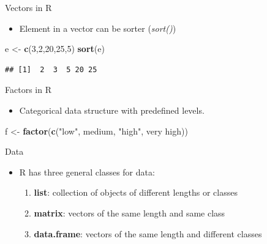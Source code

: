 \documentclass[
  ignorenonframetext,
]{beamer}
\newenvironment{Shaded}{\begin{snugshade}}{\end{snugshade}}
\newcommand{\DecValTok}[1]{\textcolor[rgb]{0.00,0.00,0.81}{#1}}
\newcommand{\FunctionTok}[1]{\textcolor[rgb]{0.13,0.29,0.53}{\textbf{#1}}}
\newcommand{\NormalTok}[1]{#1}
\newcommand{\OtherTok}[1]{\textcolor[rgb]{0.56,0.35,0.01}{#1}}
\newcommand{\StringTok}[1]{\textcolor[rgb]{0.31,0.60,0.02}{#1}}
\providecommand{\tightlist}{%
  \setlength{\itemsep}{0pt}\setlength{\parskip}{0pt}}
\begin{document}
\begin{frame}[fragile]{Vectors in R}
\label{vectors-in-r-2}
\begin{itemize}
\tightlist
\item
  Element in a vector can be sorter (\emph{sort()})
\end{itemize}

\begin{Shaded}
\begin{Highlighting}[]
\NormalTok{e }\OtherTok{\textless{}{-}} \FunctionTok{c}\NormalTok{(}\DecValTok{3}\NormalTok{,}\DecValTok{2}\NormalTok{,}\DecValTok{20}\NormalTok{,}\DecValTok{25}\NormalTok{,}\DecValTok{5}\NormalTok{)}
\FunctionTok{sort}\NormalTok{(e)}
\end{Highlighting}
\end{Shaded}

\begin{verbatim}
## [1]  2  3  5 20 25
\end{verbatim}
\end{frame}

\begin{frame}[fragile]{Factors in R}
\label{factors-in-r}
\begin{itemize}
\tightlist
\item
  Categorical data structure with predefined levels.
\end{itemize}

\begin{Shaded}
\begin{Highlighting}[]
\NormalTok{f }\OtherTok{\textless{}{-}} \FunctionTok{factor}\NormalTok{(}\FunctionTok{c}\NormalTok{(}\StringTok{"low"}\NormalTok{, }\StringTok{\textquotesingle{}medium\textquotesingle{}}\NormalTok{, }\StringTok{"high"}\NormalTok{, }\StringTok{\textquotesingle{}very high\textquotesingle{}}\NormalTok{))}
\end{Highlighting}
\end{Shaded}
\end{frame}

\begin{frame}{Data}
\label{data}
\begin{itemize}
\item
  R has three general classes for data:

  \begin{enumerate}
  \tightlist
  \item
    \textbf{list}: collection of objects of different lengths or classes
  \item
    \textbf{matrix}: vectors of the same length and same class
  \item
    \textbf{data.frame}: vectors of the same length and different
    classes
  \end{enumerate}
\end{itemize}
\end{frame}
\end{document}
